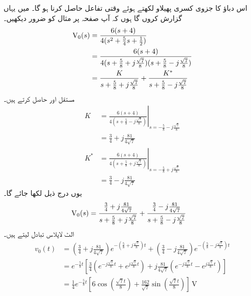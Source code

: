 اس دباؤ کا جزوی کسری پھیلاو لکھتے ہوئے وقتی تفاعل حاصل کرنا ہو گا۔ میں یہاں گزارش کروں گا ہوں کہ آپ صفحہ  پر مثال  کو ضرور دیکھیں۔
\begin{align*}
{\ensuremath{{\textup{V}}}}_0(s)&=\frac{6(s+4)}{4(s^2+\frac{5}{4}s+\frac{1}{2})}\\
&=\frac{6(s+4)}{4(s+\frac{5}{8}+j\frac{\sqrt{7}}{8})(s+\frac{5}{8}-j\frac{\sqrt{7}}{8})}\\
&=\frac{K}{s+\frac{5}{8}+j\frac{\sqrt{7}}{8}}+\frac{K^*}{s+\frac{5}{8}-j\frac{\sqrt{7}}{8}}
\end{align*}
مستقل  اور  حاصل کرتے ہیں۔
\begin{align*}
K&=\left. \frac{6(s+4)}{4(s+\frac{5}{8}-j\frac{\sqrt{7}}{8})} \right|_{s=-\frac{5}{8}-j\frac{\sqrt{7}}{8}}\\
&=\frac{3}{4}+j\frac{81}{4\sqrt{7}}\\
K^*&=\left. \frac{6(s+4)}{4(s+\frac{5}{8}+j\frac{\sqrt{7}}{8})} \right|_{s=-\frac{5}{8}+j\frac{\sqrt{7}}{8}}\\
&=\frac{3}{4}-j\frac{81}{4\sqrt{7}}
\end{align*}
یوں درج ذیل لکھا جائے گا۔
\begin{align*}
{\ensuremath{{\textup{V}}}}_0(s)&=\frac{\frac{3}{4}+j\frac{81}{4\sqrt{7}}}{s+\frac{5}{8}+j\frac{\sqrt{7}}{8}}+\frac{\frac{3}{4}-j\frac{81}{4\sqrt{7}}}{s+\frac{5}{8}-j\frac{\sqrt{7}}{8}}
\end{align*}
الٹ لاپلاس تبادل لیتے ہیں۔
\begin{align*}
v_0(t)&=\left(\frac{3}{4}+j\frac{81}{4\sqrt{7}}\right)e^{-(\frac{5}{8}+j\frac{\sqrt{7}}{8})t}+\left(\frac{3}{4}-j\frac{81}{4\sqrt{7}}\right)e^{-(\frac{5}{8}-j\frac{\sqrt{7}}{8})t}\\
&=e^{-\frac{5}{8}t}\left[\frac{3}{4}\left(e^{-j\frac{\sqrt{7}}{8}t}+e^{j\frac{\sqrt{7}}{8}t}\right)+j\frac{81}{4\sqrt{7}}\left(e^{-j\frac{\sqrt{7}}{8}t}-e^{j\frac{\sqrt{7}}{8}t}\right)\right]\\
&=\frac{1}{4} e^{-\frac{5}{8}t}\left[6\cos\left(\frac{\sqrt{7} t}{8}\right)+\frac{162}{\sqrt{7}} \sin \left(\frac{\sqrt{7}t}{8}\right)\right] \,\si{\volt}
\end{align*}

